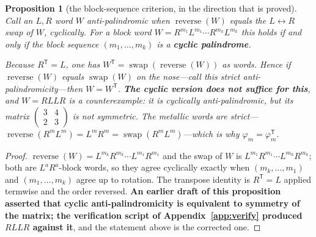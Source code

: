 \documentclass[11pt,reqno]{amsart}
\theoremstyle{plain}
\newtheorem{proposition}[theorem]{Proposition}
\theoremstyle{definition}
\theoremstyle{remark}
\begin{document}
\begin{proposition}[the block-sequence criterion, in the direction that is proved]%
\label{thm:blockpal}
Call an $L,R$ word $W$ \emph{anti-palindromic} when $\operatorname{reverse}(W)$ equals
the $L\!\leftrightarrow\!R$ swap of $W$, cyclically. For a block word
$W=R^{m_1}L^{m_1}\cdots R^{m_k}L^{m_k}$ this holds if and only if the block sequence
$(m_1,\dots,m_k)$ is a \textbf{cyclic palindrome}.

Because $R^{\mathsf T}=L$, one has $W^{\mathsf T}=\operatorname{swap}
(\operatorname{reverse}(W))$ as words. Hence if $\operatorname{reverse}(W)$ equals
$\operatorname{swap}(W)$ \emph{on the nose}---call this \emph{strict}
anti-palindromicity---then $W=W^{\mathsf T}$. \textbf{The cyclic version does not suffice
for this}, and $W=RLLR$ is a counterexample: it is cyclically anti-palindromic, but its
matrix $\left(\begin{smallmatrix}3&4\\2&3\end{smallmatrix}\right)$ is not symmetric. The
metallic words are strict---$\operatorname{reverse}(R^mL^m)=L^mR^m=\operatorname{swap}
(R^mL^m)$---which is why $\varphi_m=\varphi_m^{\mathsf T}$.
\end{proposition}

\begin{proof}
$\operatorname{reverse}(W)=L^{m_k}R^{m_k}\cdots L^{m_1}R^{m_1}$ and the swap of $W$ is
$L^{m_1}R^{m_1}\cdots L^{m_k}R^{m_k}$; both are $L^aR^a$-block words, so they agree
cyclically exactly when $(m_k,\dots,m_1)$ and $(m_1,\dots,m_k)$ agree up to rotation.
The transpose identity is $R^{\mathsf T}=L$ applied termwise and the order reversed.
\textbf{An earlier draft of this proposition asserted that cyclic anti-palindromicity is
equivalent to symmetry of the matrix; the verification script of
Appendix~\ref{app:verify} produced $RLLR$ against it}, and the statement above is the
corrected one.
\end{proof}
\end{document}
